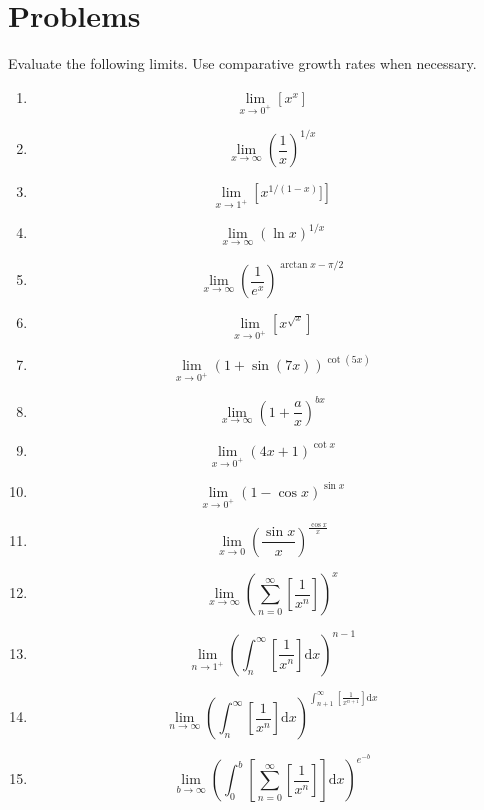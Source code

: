 \documentclass[12pt, A4]{report}
\renewcommand{\d}{\text{d}}
\begin{document}
		\section*{Problems}
			Evaluate the following limits. Use comparative growth rates when necessary.
			\begin{enumerate}
				\item
					\[\lim_{x\to 0^+}\left[x^x\right]\]
				\item
					\[\lim_{x\to\infty}\left(\frac{1}{x}\right)^{1/x}\]
				\item
					\[\lim_{x\to 1^+}\left[x^{1/(1 - x)}]\right]\]
				\item
					\[\lim_{x\to\infty}(\ln x)^{1/x}\]
				\item
					\[\lim_{x\to\infty}\left(\frac{1}{e^x}\right)^{\arctan x - \pi/2}\]
				\item
					\[\lim_{x\to 0^+}\left[x^{\sqrt{x}}\right]\]
				\item
					\[\lim_{x\to 0^+}(1 + \sin(7x))^{\cot(5x)}\]
				\item
					\[\lim_{x\to\infty}\left(1 + \frac{a}{x}\right)^{bx}\]
				\item
					\[\lim_{x\to 0^+}(4x + 1)^{\cot x}\]
				\item
					\[\lim_{x\to 0^+}(1 - \cos x)^{\sin x}\]
				\item
					\[\lim_{x\to 0}\left(\frac{\sin x}{x}\right)^\frac{\cos x}{x}\]				
				\item
					\[\lim_{x\to \infty}\left(\sum_{n = 0}^\infty\left[\frac{1}{x^n}\right]\right)^x\]
				\item
					\[\lim_{n\to 1^+}\left(\int_n^\infty\left[\frac{1}{x^n}\right]\d x\right)^{n - 1}\]
				\item
					\[\lim_{n\to\infty}\left(\int_n^{\infty}\left[\frac{1}{x^n}\right]\d x\right)^{\int_{n + 1}^\infty\left[\frac{1}{x^{n + 1}}\right]\d x}\]
				\item
					\[\lim_{b\to\infty}\left(\int_0^b\left[\sum_{n = 0}^\infty\left[\frac{1}{x^n}\right]\right]\d x\right)^{e^{-b}}\]
			\end{enumerate}
			\newpage
\end{document}
